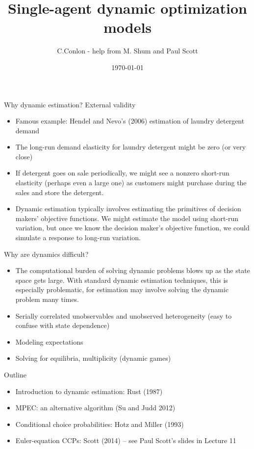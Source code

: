 \documentclass[aspectratio=169,11pt]{beamer}
\title [Single-agent dynamic optimization models]{Single-agent dynamic optimization models}
\author{C.Conlon - help from M. Shum and Paul Scott}
\institute{Grad IO}
\date{\today}
\begin{document}
\begin{frame}
\titlepage
\end{frame}


\begin{frame}{Why dynamic estimation? External validity}
\begin{itemize}
	\item<1-> Famous example: Hendel and Nevo's (2006) estimation of laundry detergent demand

	\medskip
	\item<2-> The long-run demand elasticity for laundry detergent might be zero (or very close)

	\medskip
	\item<3-> If detergent goes on sale periodically, we might see a nonzero short-run elasticity
	(perhaps even a large one) as customers might purchase during the sales and store
	the detergent.

	\medskip
	\item<4-> Dynamic estimation typically involves estimating the primitives of decision makers'
	objective functions. We might estimate the model using short-run variation, but once we
	know the decision maker's objective function, we could simulate a response to long-run
	variation.

\end{itemize}
\end{frame}



\begin{frame}{Why are dynamics difficult?}
\begin{itemize}
	\item The computational burden of solving dynamic problems blows up
		as the state space gets large. With standard dynamic estimation techniques,
		this is especially problematic,
		for estimation may involve solving the dynamic problem many times.

	\medskip
	\item Serially correlated unobservables and unobserved heterogeneity
	(easy to confuse with state dependence)
	\medskip
	\item Modeling expectations
	\medskip
	\item Solving for equilibria, multiplicity (dynamic games)
\end{itemize}
\end{frame}


\begin{frame}{Outline}
\begin{itemize}
	\item Introduction to dynamic estimation: Rust (1987)
	\item MPEC: an alternative algorithm (Su and Judd 2012)

	\medskip
	\item Conditional choice probabilities: Hotz and Miller (1993)

	\medskip
	\item Euler-equation CCPs: Scott (2014) -- see Paul Scott's slides in Lecture 11

\end{itemize}
\end{frame}
\end{document}
